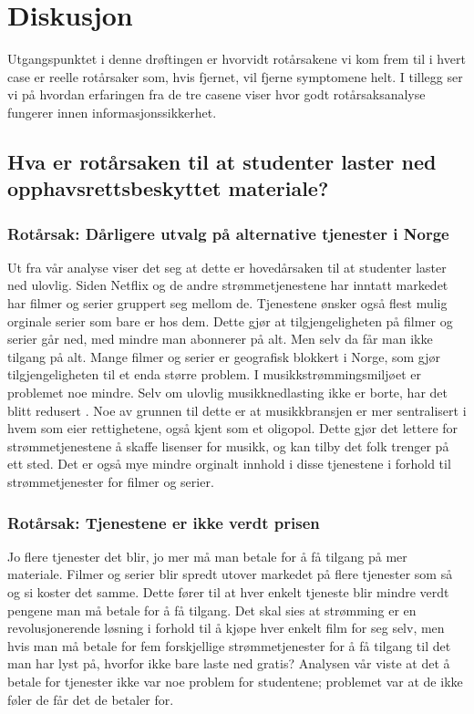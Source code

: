 \chapter{Diskusjon}
\label{kap:diskusjon}
Utgangspunktet i denne drøftingen er hvorvidt rotårsakene vi kom frem til i hvert case er reelle rotårsaker som, hvis fjernet, vil fjerne symptomene helt. I tillegg ser vi på hvordan erfaringen fra de tre casene viser hvor godt rotårsaksanalyse fungerer innen informasjonssikkerhet. 

\section{Hva er rotårsaken til at studenter laster ned opphavsrettsbeskyttet materiale?}
\subsection{Rotårsak: Dårligere utvalg på alternative tjenester i Norge}
Ut fra vår analyse viser det seg at dette er hovedårsaken til at studenter laster ned ulovlig. Siden Netflix og de andre strømmetjenestene har inntatt markedet har filmer og serier gruppert seg mellom de. Tjenestene ønsker også flest mulig orginale serier som bare er hos dem. Dette gjør at tilgjengeligheten på filmer og serier går ned, med mindre man abonnerer på alt. Men selv da får man ikke tilgang på alt. Mange filmer og serier er geografisk blokkert i Norge, som gjør tilgjengeligheten til et enda større problem. I musikkstrømmingsmiljøet er problemet noe mindre. Selv om ulovlig musikknedlasting ikke er borte, har det blitt redusert \cite{musikkstream}. Noe av grunnen til dette er at musikkbransjen er mer sentralisert i hvem som eier rettighetene, også kjent som et oligopol. Dette gjør det lettere for strømmetjenestene å skaffe lisenser for musikk, og kan tilby det folk trenger på ett sted. Det er også mye mindre orginalt innhold i disse tjenestene i forhold til strømmetjenester for filmer og serier. 

\subsection{Rotårsak: Tjenestene er ikke verdt prisen}
Jo flere tjenester det blir, jo mer må man betale for å få tilgang på mer materiale. Filmer og serier blir spredt utover markedet på flere tjenester som så og si koster det samme. Dette fører til at hver enkelt tjeneste blir mindre verdt pengene man må betale for å få tilgang. Det skal sies at strømming er en revolusjonerende løsning i forhold til å kjøpe hver enkelt film for seg selv, men hvis man må betale for fem forskjellige strømmetjenester for å få tilgang til det man har lyst på, hvorfor ikke bare laste ned gratis? Analysen vår viste at det å betale for tjenester ikke var noe problem for studentene; problemet var at de ikke føler de får det de betaler for. 

